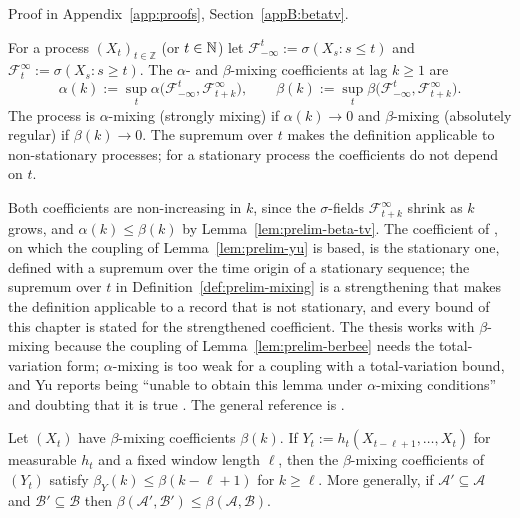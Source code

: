 \documentclass[../../../main.tex]{subfiles}
\begin{document}
Proof in Appendix~\ref{app:proofs}, Section~\ref{appB:betatv}.

\begin{definition}\label{def:prelim-mixing}
For a process $(X_t)_{t\in\mathbb Z}$ (or $t\in\mathbb{N}$) let $\mathcal F_{-\infty}^{t}:=\sigma(X_s:s\le t)$ and $\mathcal F_{t}^{\infty}:=\sigma(X_s:s\ge t)$. The $\alpha$- and $\beta$-mixing coefficients at lag $k\ge1$ are
\[
\alpha(k):=\sup_{t}\alpha\big(\mathcal F_{-\infty}^{t},\mathcal F_{t+k}^{\infty}\big),\qquad
\beta(k):=\sup_{t}\beta\big(\mathcal F_{-\infty}^{t},\mathcal F_{t+k}^{\infty}\big).
\]
The process is $\alpha$-mixing (strongly mixing) if $\alpha(k)\to0$ and $\beta$-mixing (absolutely regular) if $\beta(k)\to0$. The supremum over $t$ makes the definition applicable to non-stationary processes; for a stationary process the coefficients do not depend on $t$.
\end{definition}

Both coefficients are non-increasing in $k$, since the $\sigma$-fields $\mathcal F_{t+k}^{\infty}$ shrink as $k$ grows, and $\alpha(k)\le\beta(k)$ by Lemma~\ref{lem:prelim-beta-tv}. The coefficient of \cite[Def.~2.2, p.~96]{yu1994}, on which the coupling of Lemma~\ref{lem:prelim-yu} is based, is the stationary one, defined with a supremum over the time origin of a stationary sequence; the supremum over $t$ in Definition~\ref{def:prelim-mixing} is a strengthening that makes the definition applicable to a record that is not stationary, and every bound of this chapter is stated for the strengthened coefficient. The thesis works with $\beta$-mixing because the coupling of Lemma~\ref{lem:prelim-berbee} needs the total-variation form; $\alpha$-mixing is too weak for a coupling with a total-variation bound, and Yu reports being ``unable to obtain this lemma under $\alpha$-mixing conditions'' and doubting that it is true \cite[p.~102, Remark~(ii)]{yu1994}. The general reference is \cite{doukhan1994}.

\begin{lemma}\label{lem:prelim-inherit}
Let $(X_t)$ have $\beta$-mixing coefficients $\beta(k)$. If $Y_t:=h_t(X_{t-\ell+1},\dots,X_t)$ for measurable $h_t$ and a fixed window length $\ell$, then the $\beta$-mixing coefficients of $(Y_t)$ satisfy $\beta_Y(k)\le\beta(k-\ell+1)$ for $k\ge\ell$. More generally, if $\mathcal A'\subseteq\mathcal A$ and $\mathcal B'\subseteq\mathcal B$ then $\beta(\mathcal A',\mathcal B')\le\beta(\mathcal A,\mathcal B)$.
\end{lemma}
\end{document}
